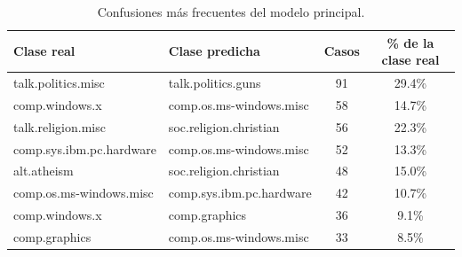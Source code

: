 \begin{table}[H]
\centering
\caption{Confusiones más frecuentes del modelo principal.}
\label{tab:confusiones}
\small
\begin{tabular}{llcc}
\toprule
Clase real & Clase predicha & Casos & \% de la clase real \\
\midrule
talk.politics.misc & talk.politics.guns & 91 & 29.4\% \\
comp.windows.x & comp.os.ms-windows.misc & 58 & 14.7\% \\
talk.religion.misc & soc.religion.christian & 56 & 22.3\% \\
comp.sys.ibm.pc.hardware & comp.os.ms-windows.misc & 52 & 13.3\% \\
alt.atheism & soc.religion.christian & 48 & 15.0\% \\
comp.os.ms-windows.misc & comp.sys.ibm.pc.hardware & 42 & 10.7\% \\
comp.windows.x & comp.graphics & 36 & 9.1\% \\
comp.graphics & comp.os.ms-windows.misc & 33 & 8.5\% \\
\bottomrule
\end{tabular}
\end{table}
